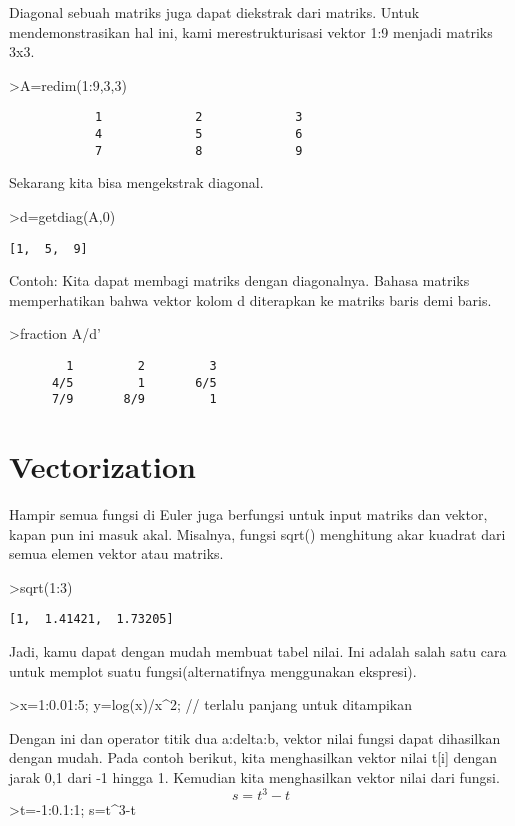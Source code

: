 \documentclass[
]{book}
\begin{document}
Diagonal sebuah matriks juga dapat diekstrak dari matriks. Untuk mendemonstrasikan hal ini, kami merestrukturisasi vektor 1:9 menjadi matriks 3x3.

\textgreater A=redim(1:9,3,3)

\begin{verbatim}
            1             2             3 
            4             5             6 
            7             8             9 
\end{verbatim}

Sekarang kita bisa mengekstrak diagonal.

\textgreater d=getdiag(A,0)

\begin{verbatim}
[1,  5,  9]
\end{verbatim}

Contoh: Kita dapat membagi matriks dengan diagonalnya. Bahasa matriks memperhatikan bahwa vektor kolom d diterapkan ke matriks baris demi baris.

\textgreater fraction A/d'

\begin{verbatim}
        1         2         3 
      4/5         1       6/5 
      7/9       8/9         1 
\end{verbatim}

\chapter{Vectorization}\label{vectorization}

Hampir semua fungsi di Euler juga berfungsi untuk input matriks dan vektor, kapan pun ini masuk akal. Misalnya, fungsi sqrt() menghitung akar kuadrat dari semua elemen vektor atau matriks.

\textgreater sqrt(1:3)

\begin{verbatim}
[1,  1.41421,  1.73205]
\end{verbatim}

Jadi, kamu dapat dengan mudah membuat tabel nilai. Ini adalah salah satu cara untuk memplot suatu fungsi(alternatifnya menggunakan ekspresi).

\textgreater x=1:0.01:5; y=log(x)/x\^{}2; // terlalu panjang untuk ditampikan

Dengan ini dan operator titik dua a:delta:b, vektor nilai fungsi dapat dihasilkan dengan mudah. Pada contoh berikut, kita menghasilkan vektor nilai t{[}i{]} dengan jarak 0,1 dari -1 hingga 1. Kemudian kita menghasilkan vektor nilai dari fungsi. \[s = t^3-t\]\textgreater t=-1:0.1:1; s=t\^{}3-t
\end{document}
